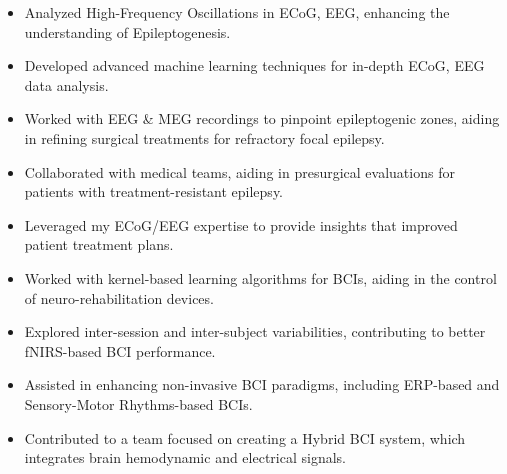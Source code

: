 \documentclass[10pt,letterpaper,sans]{moderncv}   %
\begin{document}
{{
\begin{itemize} 
	\item Analyzed High-Frequency Oscillations in ECoG, EEG, enhancing the understanding of Epileptogenesis.
	\item Developed advanced machine learning techniques for in-depth ECoG, EEG data analysis.
	\item Worked with EEG \& MEG recordings to pinpoint epileptogenic zones, aiding in refining surgical treatments for refractory focal epilepsy. 
	\item Collaborated with medical teams, aiding in presurgical evaluations for patients with treatment-resistant epilepsy. 
	\item Leveraged my ECoG/EEG expertise to provide insights that improved patient treatment plans.
\end{itemize}
}}


{{
	\begin{itemize}%
		\item Worked with kernel-based learning algorithms for BCIs, aiding in the control of neuro-rehabilitation devices. 
		\item Explored inter-session and inter-subject variabilities, contributing to better fNIRS-based BCI performance. 
		\item Assisted in enhancing non-invasive BCI paradigms, including ERP-based and Sensory-Motor Rhythms-based BCIs. 
		\item Contributed to a team focused on creating a Hybrid BCI system, which integrates brain hemodynamic and electrical signals. 
	\end{itemize}
}}

\end{document}
